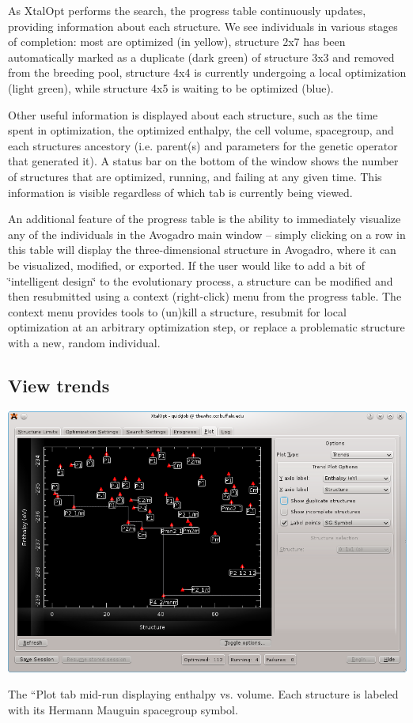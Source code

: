As Xtal\+Opt performs the search, the progress table continuously updates, providing information about each structure. We see individuals in various stages of completion\+: most are optimized (in yellow), structure 2x7 has been automatically marked as a duplicate (dark green) of structure 3x3 and removed from the breeding pool, structure 4x4 is currently undergoing a local optimization (light green), while structure 4x5 is waiting to be optimized (blue).

Other useful information is displayed about each structure, such as the time spent in optimization, the optimized enthalpy, the cell volume, spacegroup, and each structure\textquotesingle{}s ancestory (i.\+e. parent(s) and parameters for the genetic operator that generated it). A status bar on the bottom of the window shows the number of structures that are optimized, running, and failing at any given time. This information is visible regardless of which tab is currently being viewed.

An additional feature of the progress table is the ability to immediately visualize any of the individuals in the Avogadro main window -- simply clicking on a row in this table will display the three-\/dimensional structure in Avogadro, where it can be visualized, modified, or exported. If the user would like to add a bit of \char`\"{}intelligent design\char`\"{} to the evolutionary process, a structure can be modified and then resubmitted using a context (right-\/click) menu from the progress table. The context menu provides tools to (un)kill a structure, resubmit for local optimization at an arbitrary optimization step, or replace a problematic structure with a new, random individual.\hypertarget{tut-xo_trends}{}\subsection{View trends}\label{tut-xo_trends}

\begin{DoxyImage}
\includegraphics[width=\textwidth]{trend-view.png}
\caption{The ``\+Plot\textquotesingle{}\textquotesingle{} tab mid-\/run displaying enthalpy vs. volume. Each structure is labeled with its Hermann Mauguin spacegroup symbol.}
\end{DoxyImage}


